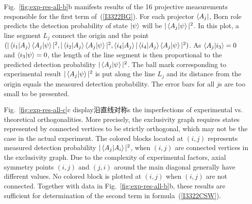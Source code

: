 \documentclass[pra,aps,notitlepage,superscriptaddress,showpacs,showkeys]{revtex4-1}
\theoremstyle{definition}
\theoremstyle{remark}
\begin{document}
 Fig.~\ref{fig:exp-res-all-b}b manifests results of the 16 projective measurements responsible for the first term of~(\ref{I3322BG}). 
 For each projector $\bra{A_j}$, Born role predicts the detection probability of state $\ket{\psi}$ will be $|\braket{A_j|\psi}|^2$. 
 In this plot, a line segment $L_j$ connect the origin and the point $(|\braket{i_1|A_j}\braket{A_j|\psi}|^2, |\braket{i_2|A_j}\braket{A_j|\psi}|^2, \braket{i_4|A_j}|\braket{i_4|A_j}\braket{A_j|\psi}|^2)$. As $\braket{A_j|i_3}=0$ and $\braket{i_3|\psi}=0$, the length of the line segment is then proportional to the predicted detection probability $|\braket{A_j|\psi}|^2$. 
 The ball mark corresponding to experimental result $|\braket{A_j|\psi}|^2$ is put along the line $L_j$ and its distance from the origin equals the measured detection probability.
 The error bars for all $j$s are too small to be presented.
 
 Fig.~\ref{fig:exp-res-all-c}c display沿直线对称s the imperfections of experimental vs. theoretical orthogonalities. More precisely, the exclusivity graph requires states represented by connected vertices to be strictly orthogonal, which may not be the case in the actual experiment.
 The colored blocks located at $(i, j)$ represents measured detection probability $|\braket{A_j|A_i}|^2$, when $(i, j)$ are connected vertices in the exclusivity graph. Due to the complexity of experimental factors, axial symmetry points $(i, j)$ and $(j, i)$ around the main diagonal generally have different values.
 No colored block is plotted at $(i, j)$ when $(i, j)$ are not connected. 
 Together with data in Fig.~\ref{fig:exp-res-all-b}b, these results are sufficient for determination of the second term in formula~(\ref{I3322CSW}).
 
\end{document}
